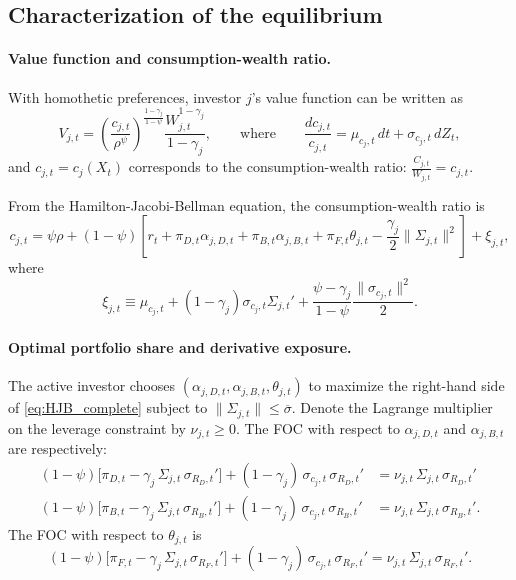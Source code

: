 \documentclass[11pt,english]{article}
\begin{document}
\subsection{Characterization of the equilibrium}

\paragraph{Value function and consumption-wealth ratio.} With homothetic preferences, investor $j$'s value function can be written as
\begin{equation}\nonumber
    V_{j,t} = \left( \frac{c_{j,t}}{\rho^\psi} \right)^{\frac{1-\gamma_j}{1-\psi}} 
    \frac{W_{j,t}^{1-\gamma_j}}{1-\gamma_j}, \qquad \text{where} \qquad \frac{dc_{j,t}}{c_{j,t}} = \mu_{c_j,t}\, dt + \sigma_{c_j,t}\, dZ_t,
\end{equation}
and $c_{j,t} = c_j(X_t)$ corresponds to the consumption-wealth ratio: $\frac{C_{j,t}}{W_{j,t}} = c_{j,t}$.

From the Hamilton-Jacobi-Bellman equation, the consumption-wealth ratio is
\begin{equation}\label{eq:HJB_complete}
    c_{j,t} = \psi \rho 
    + (1-\psi) \left[ r_t + \pi_{D,t} \alpha_{j,D,t} + \pi_{B,t} \alpha_{j,B,t} + \pi_{F,t} \theta_{j,t}
        - \frac{\gamma_j}{2} \|\Sigma_{j,t}\|^2 \right] 
    + \xi_{j,t},
\end{equation}
where 
\[
    \xi_{j,t} \equiv \mu_{c_j,t} 
    + (1-\gamma_j) \sigma_{c_j,t} \Sigma_{j,t}' 
    + \frac{\psi - \gamma_j}{1-\psi} \frac{\|\sigma_{c_j,t}\|^2}{2}.
\]

\paragraph{Optimal portfolio share and derivative exposure.} 
The active investor chooses $(\alpha_{j,D,t},\alpha_{j,B,t},\theta_{j,t})$ to maximize the right-hand side of \eqref{eq:HJB_complete} subject to $\|\Sigma_{j,t}\|\le\overline{\sigma}$. 
Denote the Lagrange multiplier on the leverage constraint by $\nu_{j,t}\ge 0$. The FOC with respect to $\alpha_{j,D,t}$ and $\alpha_{j,B,t}$ are respectively:
\begin{align}\label{eq:FOC_alpha_D_complete}
    (1-\psi)\Big[\pi_{D,t} - \gamma_j\,\Sigma_{j,t}\,\sigma_{R_D,t}'\Big] + (1-\gamma_j)\,\sigma_{c_j,t}\,\sigma_{R_D,t}' &= \nu_{j,t}\,\Sigma_{j,t}\,\sigma_{R_D,t}'\\
    (1-\psi)\Big[\pi_{B,t} - \gamma_j\,\Sigma_{j,t}\,\sigma_{R_B,t}'\Big] + (1-\gamma_j)\,\sigma_{c_j,t}\,\sigma_{R_B,t}' &= \nu_{j,t}\,\Sigma_{j,t}\,\sigma_{R_B,t}'.
\end{align}
The FOC with respect to $\theta_{j,t}$ is
\begin{equation}\label{eq:FOC_theta_complete}
    (1-\psi)\Big[\pi_{F,t} - \gamma_j\,\Sigma_{j,t}\,\sigma_{R_F,t}'\Big] + (1-\gamma_j)\,\sigma_{c_j,t}\,\sigma_{R_F,t}' = \nu_{j,t}\,\Sigma_{j,t}\,\sigma_{R_F,t}'.
\end{equation}
\end{document}
